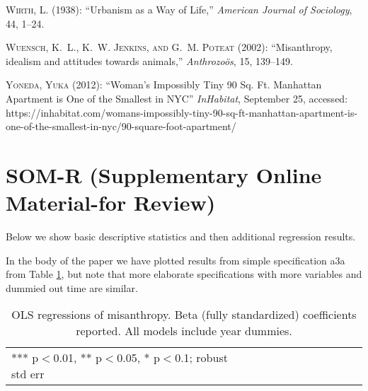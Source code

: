 \documentclass[11pt, letterpaper]{article}
\begin{document}
\begin{spacing}{1.4}
\begin{thebibliography}{92}
\textsc{Wirth, L.} (1938): \enquote{Urbanism as a Way of Life,} \emph{American
  Journal of Sociology}, 44, 1--24.

\textsc{Wuensch, K.~L., K.~W. Jenkins, and G.~M. Poteat} (2002):
  \enquote{Misanthropy, idealism and attitudes towards animals,}
  \emph{Anthrozo{\"o}s}, 15, 139--149.
  
\textsc{Yoneda, Yuka} (2012):
  \enquote{Woman's Impossibly Tiny 90 Sq. Ft. Manhattan Apartment is One of the Smallest in NYC}
  \emph{InHabitat}, September 25, accessed: https://inhabitat.com/womans-impossibly-tiny-90-sq-ft-manhattan-apartment-is-one-of-the-smallest-in-nyc/90-square-foot-apartment/

\end{thebibliography}

\section*{\LARGE SOM-R (Supplementary Online Material-for Review)}

Below we show basic descriptive statistics and then  additional regression results.



 
 
 
 

In the body of the paper we have plotted  results from simple specification a3a
from Table \ref{regDbyHand}, but note that more elaborate specifications with
more variables and dummied out time are similar.

 \begin{spacing}{.8}
\begin{table}[H]\centering
\caption{OLS regressions  of misanthropy. Beta (fully standardized) coefficients
  reported. All models include year dummies.} \label{regDbyHand}
\begin{scriptsize} \begin{tabular}{p{1.2in}p{.45in}p{.45in}p{.45in}p{.45in}p{.45in}p{.45in}p{.45in}p{.45in}p{.45in}p{.45 in}}\hline
 \hline  *** p$<$0.01, ** p$<$0.05, * p$<$0.1; robust std err
\end{tabular}\end{scriptsize}\end{table}
 \end{spacing}



\end{spacing}
\end{document}
